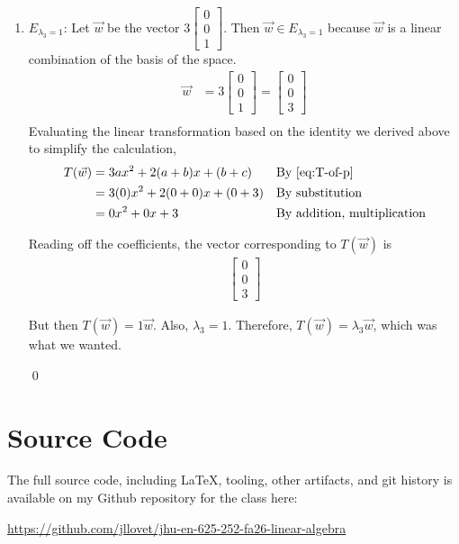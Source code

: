 \documentclass[10pt,letterpaper,final]{report}
\newcommand{\reason}[1]{&& \text{#1}}
\begin{document}
\begin{enumerate}[label=(\alph*)]
\begin{enumerate}
          \item $E_{\lambda_3 = 1}$: Let $\vec{w}$ be the vector $3\begin{bmatrix}0\\0\\1\end{bmatrix}$. Then $\vec{w} \in E_{\lambda_3 = 1}$ because $\vec{w}$ is a linear combination of the basis of the space.
                \begin{align*}
                  \vec{w} & = 3\begin{bmatrix}0\\0\\1\end{bmatrix} = \begin{bmatrix}
                                                                       0 \\0\\3
                                                                     \end{bmatrix} \\[1ex]
                \end{align*}
                Evaluating the linear transformation based on the identity we derived above to simplify the calculation,
                \begin{align*}
                  T(\vec{w}) & = 3ax^2 + 2(a+b)x + (b + c) \reason{By \eqref{eq:T-of-p}} \\
                             & = 3(0)x^2 + 2(0+0)x + (0 + 3) \reason{By substitution}    \\
                             & = 0x^2 + 0x + 3 \reason{By addition, multiplication}
                \end{align*}

                Reading off the coefficients, the vector corresponding to $T(\vec{w})$ is
                \begin{align*}
                  \begin{bmatrix}
                    0 \\0\\3
                  \end{bmatrix}
                \end{align*}

                But then $T(\vec{w}) = 1\vec{w}$. Also, $\lambda_3 = 1$. Therefore, $T(\vec{w}) = \lambda_3\vec{w}$, which was what we wanted.

                \qed

        \end{enumerate}
\end{enumerate}

\pagebreak

\section*{Source Code}
The full source code, including LaTeX, tooling, other artifacts, and git history is available on my Github repository for the class here:
\begin{center}
  \url{https://github.com/jllovet/jhu-en-625-252-fa26-linear-algebra}
\end{center}

\printbibliography
\end{document}
